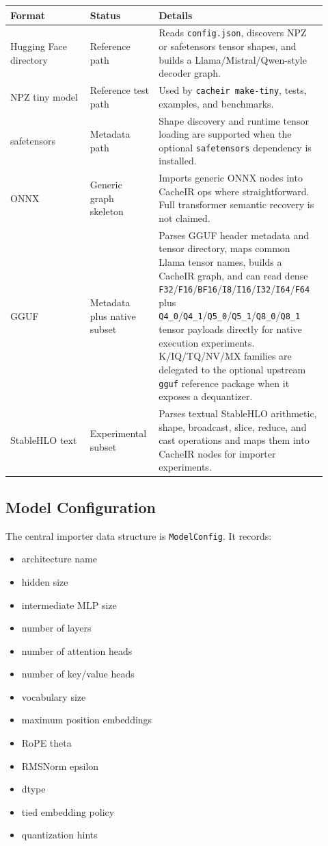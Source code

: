 \documentclass[11pt]{article}
\begin{document}
\begin{longtable}{p{0.24\linewidth}p{0.18\linewidth}p{0.50\linewidth}}
\toprule
\textbf{Format} & \textbf{Status} & \textbf{Details} \\
\midrule
Hugging Face directory & Reference path & Reads \texttt{config.json}, discovers
NPZ or safetensors tensor shapes, and builds a Llama/Mistral/Qwen-style decoder
graph. \\
NPZ tiny model & Reference test path & Used by \texttt{cacheir make-tiny}, tests,
examples, and benchmarks. \\
safetensors & Metadata path & Shape discovery and runtime tensor loading
are supported when the optional \texttt{safetensors} dependency is installed. \\
ONNX & Generic graph skeleton & Imports generic ONNX nodes into CacheIR ops where
straightforward. Full transformer semantic recovery is not claimed. \\
GGUF & Metadata plus native subset & Parses GGUF header metadata and tensor
directory, maps common Llama tensor names, builds a CacheIR graph, and can read
dense \texttt{F32}/\texttt{F16}/\texttt{BF16}/\texttt{I8}/\texttt{I16}/\texttt{I32}/\texttt{I64}/\texttt{F64} plus \texttt{Q4\_0}/\texttt{Q4\_1}/\texttt{Q5\_0}/\texttt{Q5\_1}/\texttt{Q8\_0}/\texttt{Q8\_1}
tensor payloads directly for native execution experiments. K/IQ/TQ/NV/MX
families are delegated to the optional upstream \texttt{gguf} reference package
when it exposes a dequantizer. \\
StableHLO text & Experimental subset & Parses textual StableHLO arithmetic,
shape, broadcast, slice, reduce, and cast operations and maps them into CacheIR
nodes for importer experiments. \\
\bottomrule
\end{longtable}

\subsection{Model Configuration}

The central importer data structure is \texttt{ModelConfig}. It records:

\begin{itemize}[leftmargin=*]
  \item architecture name
  \item hidden size
  \item intermediate MLP size
  \item number of layers
  \item number of attention heads
  \item number of key/value heads
  \item vocabulary size
  \item maximum position embeddings
  \item RoPE theta
  \item RMSNorm epsilon
  \item dtype
  \item tied embedding policy
  \item quantization hints
\end{itemize}
\end{document}
